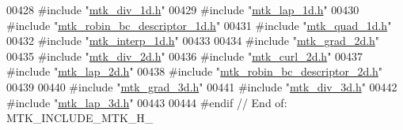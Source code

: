 \begin{DoxyCode}
00428 \textcolor{preprocessor}{#include "\hyperlink{mtk__div__1d_8h}{mtk\_div\_1d.h}"}
00429 \textcolor{preprocessor}{#include "\hyperlink{mtk__lap__1d_8h}{mtk\_lap\_1d.h}"}
00430 \textcolor{preprocessor}{#include "\hyperlink{mtk__robin__bc__descriptor__1d_8h}{mtk\_robin\_bc\_descriptor\_1d.h}"}
00431 \textcolor{preprocessor}{#include "\hyperlink{mtk__quad__1d_8h}{mtk\_quad\_1d.h}"}
00432 \textcolor{preprocessor}{#include "\hyperlink{mtk__interp__1d_8h}{mtk\_interp\_1d.h}"}
00433 
00434 \textcolor{preprocessor}{#include "\hyperlink{mtk__grad__2d_8h}{mtk\_grad\_2d.h}"}
00435 \textcolor{preprocessor}{#include "\hyperlink{mtk__div__2d_8h}{mtk\_div\_2d.h}"}
00436 \textcolor{preprocessor}{#include "\hyperlink{mtk__curl__2d_8h}{mtk\_curl\_2d.h}"}
00437 \textcolor{preprocessor}{#include "\hyperlink{mtk__lap__2d_8h}{mtk\_lap\_2d.h}"}
00438 \textcolor{preprocessor}{#include "\hyperlink{mtk__robin__bc__descriptor__2d_8h}{mtk\_robin\_bc\_descriptor\_2d.h}"}
00439 
00440 \textcolor{preprocessor}{#include "\hyperlink{mtk__grad__3d_8h}{mtk\_grad\_3d.h}"}
00441 \textcolor{preprocessor}{#include "\hyperlink{mtk__div__3d_8h}{mtk\_div\_3d.h}"}
00442 \textcolor{preprocessor}{#include "\hyperlink{mtk__lap__3d_8h}{mtk\_lap\_3d.h}"}
00443 
00444 \textcolor{preprocessor}{#endif // End of: MTK\_INCLUDE\_MTK\_H\_}
\end{DoxyCode}
